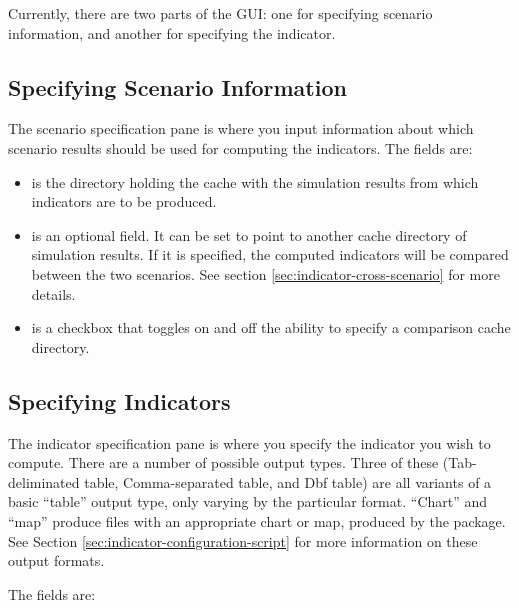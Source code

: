 Currently, there are two parts of the GUI: one for specifying scenario 
information, and another for specifying the indicator. 

\subsection{Specifying Scenario Information}
The scenario specification pane is where you input information 
about which scenario results should be used for computing the indicators. 
The fields are:

\begin{itemize}

\tight

\item {} is the directory holding the cache with the
simulation results from which indicators are to be produced.

\item {} is an optional field. It can be set to
point to another cache directory of simulation results.  If it is
specified, the computed indicators will be compared between the two
scenarios. See section \ref{sec:indicator-cross-scenario} for more details.

\item {} is a checkbox that toggles
on and off the ability to specify a comparison cache directory.

\end{itemize}

\subsection{Specifying Indicators}

The indicator specification pane is where you specify the indicator you
wish to compute. There are a number of possible output types.  Three of
these (Tab-deliminated table, Comma-separated table, and Dbf table) are all
variants of a basic ``table'' output type, only varying by the particular
format.  ``Chart'' and ``map'' produce  files with an
appropriate chart or map, produced by the  package.
See Section \ref{sec:indicator-configuration-script}
for more information on these output formats.

The fields are:

